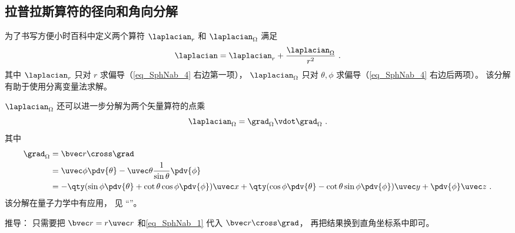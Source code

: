 \subsection{拉普拉斯算符的径向和角向分解}
为了书写方便小时百科中定义两个算符 $\laplacian_r$ 和 $\laplacian_\Omega$ 满足
\begin{equation}\label{eq_SphNab_3}
\laplacian = \laplacian_r + \frac{\laplacian_\Omega}{r^2}~.
\end{equation}
其中 $\laplacian_r$ 只对 $r$ 求偏导（\autoref{eq_SphNab_4} 右边第一项）， $\laplacian_\Omega$ 只对 $\theta,\phi$ 求偏导（\autoref{eq_SphNab_4} 右边后两项）。 该分解有助于使用分离变量法求解。

$\laplacian_\Omega$ 还可以进一步分解为两个矢量算符的点乘
\begin{equation}
\laplacian_\Omega = \grad_\Omega\vdot \grad_\Omega~.
\end{equation}
其中
\begin{equation}
\begin{aligned}
\grad_\Omega &= \bvec r \cross \grad\\
&= \uvec \phi \pdv{\theta} - \uvec \theta\frac{1}{\sin\theta} \pdv{\phi}\\
&= -\qty(\sin\phi\pdv{\theta} + \cot\theta\cos\phi\pdv{\phi})\uvec x
+ \qty(\cos\phi\pdv{\theta} - \cot\theta \sin\phi \pdv{\phi}) \uvec y
+ \pdv{\phi} \uvec z~.
\end{aligned}
\end{equation}
该分解在量子力学中有应用， 见 “”。

推导： 只需要把 $\bvec r = r \uvec r$ 和\autoref{eq_SphNab_1} 代入 $\bvec r \cross \grad$， 再把结果换到直角坐标系中即可。

